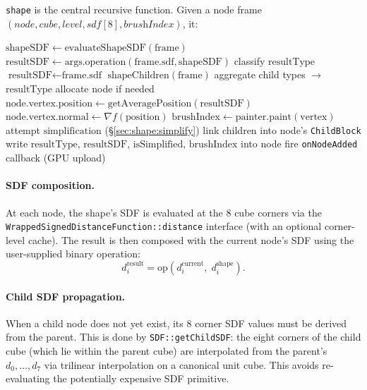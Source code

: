 \documentclass[10pt,a4paper]{article}
\begin{document}
\lstinline{shape} is the central recursive function.  Given a node frame
$(\textit{node}, \textit{cube}, \textit{level}, \textit{sdf}[8],
\textit{brushIndex})$, it:

\begin{algorithm}[H]
\caption{\lstinline{shape}(frame, args)}
\label{alg:shape}
\begin{algorithmic}[1]
\State $\text{shapeSDF} \leftarrow \text{evaluateShapeSDF}(\text{frame})$
  \State $\text{resultSDF} \leftarrow \text{args.operation}(\text{frame.sdf}, \text{shapeSDF})$
  \State classify $\text{resultType}$
\Else
    \State $\text{resultSDF} \leftarrow \text{frame.sdf}$ 
  \Else
    \State $\text{shapeChildren}(\text{frame})$ 
    \State aggregate child types $\to$ $\text{resultType}$
  \EndIf
\EndIf
{}
  \State allocate node if needed
  \State $\text{node.vertex.position} \leftarrow \text{getAveragePosition}(\text{resultSDF})$
  \State $\text{node.vertex.normal} \leftarrow \nabla f(\text{position})$
    \State $\text{brushIndex} \leftarrow \text{painter.paint}(\text{vertex})$
  \Else
    \State attempt $\text{simplification}$ (\S\ref{sec:shape:simplify})
    \State link children into node's \lstinline{ChildBlock}
  \EndIf
\EndIf
\State write $\text{resultType}$, $\text{resultSDF}$, $\text{isSimplified}$, $\text{brushIndex}$ into node
  \State fire \lstinline{onNodeAdded} callback (GPU upload)
\EndIf
\end{algorithmic}
\end{algorithm}

\paragraph{SDF composition.}
At each node, the shape's SDF is evaluated at the 8 cube corners via the
\lstinline{WrappedSignedDistanceFunction::distance} interface (with an
optional corner-level cache).  The result is then composed with the
current node's SDF using the user-supplied binary operation:
\[
  d_i^{\text{result}} = \text{op}(d_i^{\text{current}},\; d_i^{\text{shape}}).
\]

\paragraph{Child SDF propagation.}
When a child node does not yet exist, its 8 corner SDF values must be
derived from the parent.  This is done by
\lstinline{SDF::getChildSDF}: the eight corners of the child cube (which
lie within the parent cube) are interpolated from the parent's
$d_0,\ldots,d_7$ via trilinear interpolation on a canonical unit cube.
This avoids re-evaluating the potentially expensive SDF primitive.
\end{document}
